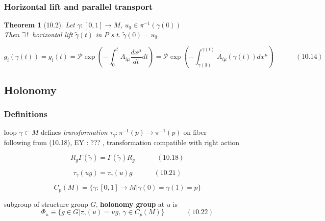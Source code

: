 \documentclass[twoside]{amsart}
\newtheorem{theorem}{Theorem}
\begin{document}
\subsubsection{ Horizontal lift and parallel transport }

\begin{theorem}[10.2] Let $\gamma:[0,1] \to M$, $u_0 \in \pi^{-1}(\gamma(0))$ \\
Then $\exists \, ! \, $ horizontal lift $\widetilde{\gamma}(t)$ in $P$ s.t. $\widetilde{\gamma}{(0)} = u_0$ 
\end{theorem}



\begin{equation}
  g_i(\gamma(t)) = g_i(t) = \mathcal{P}\exp{ \left( -\int_0^t A_{i \mu} \frac{dx^{\mu} }{dt} dt \right) } = \mathcal{P}\exp{ \left( - \int_{\gamma(0)}^{\gamma(t)} A_{i\mu}(\gamma(t))dx^{\mu} \right) } \quad \quad \quad \, (10.14)
\end{equation}

\subsection{Holonomy}

\subsubsection{Definitions}

loop $\gamma \subset M$ defines \emph{transformation} $\tau_{\gamma}: \pi^{-1}(p) \to \pi^{-1}(p)$ on fiber \\
following from (10.18), EY : ??? , transformation compatible with right action

\begin{equation}
  R_g \Gamma(\widetilde{\gamma}) = \Gamma(\widetilde{\gamma})R_g \quad \quad \quad \, (10.18)
\end{equation}

\begin{equation}
  \tau_{\gamma}(ug) = \tau_{\gamma}(u)g  \quad \quad \quad \, (10.21)
\end{equation}


\[
C_p(M) = \lbrace \gamma: [0,1] \to M | \gamma(0)=  \gamma(1) = p \rbrace
\]

subgroup of structure group $G$, \textbf{holonomy group} at $u$ is 
\begin{equation}
 \Phi_u \equiv \lbrace g \in G | \tau_{\gamma}(u) = ug, \, \gamma \in C_p(M) \rbrace   \quad \quad \quad \, (10.22)
\end{equation}
\end{document}
